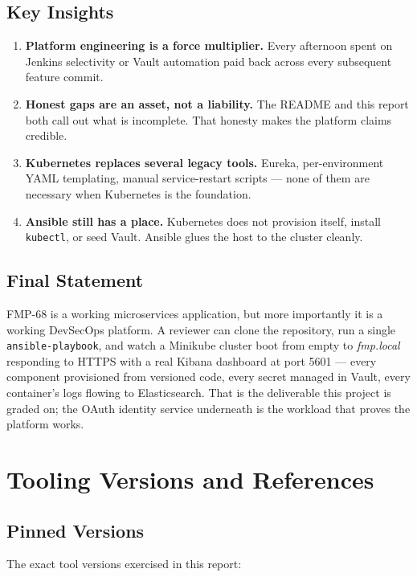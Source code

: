 \documentclass[11pt,a4paper]{article}
\begin{document}
\subsection{Key Insights}
\begin{enumerate}[leftmargin=*]
  \item \textbf{Platform engineering is a force multiplier.}  Every
        afternoon spent on Jenkins selectivity or Vault automation
        paid back across every subsequent feature commit.
  \item \textbf{Honest gaps are an asset, not a liability.}  The
        README and this report both call out what is incomplete.
        That honesty makes the platform claims credible.
  \item \textbf{Kubernetes replaces several legacy tools.}  Eureka,
        per-environment YAML templating, manual service-restart
        scripts — none of them are necessary when Kubernetes is
        the foundation.
  \item \textbf{Ansible still has a place.}  Kubernetes does not
        provision itself, install \texttt{kubectl}, or seed Vault.
        Ansible glues the host to the cluster cleanly.
\end{enumerate}

\subsection{Final Statement}
FMP-68 is a working microservices application, but more importantly
it is a working DevSecOps platform.  A reviewer can clone the
repository, run a single \texttt{ansible-playbook}, and watch a
Minikube cluster boot from empty to \emph{fmp.local} responding to
HTTPS with a real Kibana dashboard at port 5601 — every component
provisioned from versioned code, every secret managed in Vault,
every container's logs flowing to Elasticsearch.  That is the
deliverable this project is graded on; the OAuth identity service
underneath is the workload that proves the platform works.

\section{Tooling Versions and References}

\subsection{Pinned Versions}
The exact tool versions exercised in this report:
\end{document}

